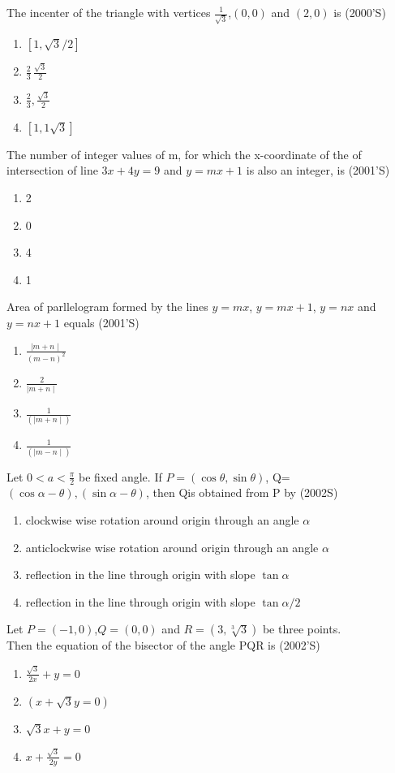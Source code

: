 \documentclass[12pt]{article}
\begin{document}
\item The incenter of the triangle with vertices $\frac{1}{\sqrt{3}}$,$(0,0)$ and $(2,0)$ is (2000'S)
\begin{enumerate}
\item $[1,\sqrt{3}/2]$ 
\item $\frac{2}{3}\,\frac{\sqrt{3}}{2}$ 
\item $\frac{2}{3},\frac{\sqrt{3}}{2}$ 
\item $[1,{1}{\sqrt{3}}]$
\end{enumerate}
\item The number of integer values of m, for which the x-coordinate of the of intersection of line $3x+4y=9$ and $y=mx+1$ is also an integer, is (2001'S)
\begin{enumerate}
\item 2 
\item 0 
\item 4   
\item 1
\end{enumerate}
\item Area of parllelogram formed by the lines $y=mx$, $y=mx+1$, $y=nx$ and $y=nx+1$ equals (2001'S)
\begin{enumerate}
\item $\frac{\mid m+n\mid}{(m-n)^2}$
\item $\frac{2}{\mid m+n \mid}$
\item $\frac{1}{(\mid m+n \mid)}$
\item $\frac{1}{(\mid m-n\mid)}$
\end{enumerate}
\item Let $0<a<\frac{\pi}{2}$ be fixed angle. If $P=(\cos\theta,\sin\theta)$, Q=$(\cos\alpha-\theta),(\sin\alpha-\theta)$, then Qis obtained from P by (2002S)
\begin{enumerate}
\item clockwise wise rotation around origin through an angle $\alpha$
\item anticlockwise wise rotation around origin through an angle $\alpha$
\item reflection in the line through origin with slope $\tan\alpha$
\item reflection in the line through origin with slope $\tan\alpha/2$
\end{enumerate}
\item Let $P=(-1,0)$,$Q=(0,0)$ and $R=(3,\sqrt[3]{3})$ be three points.\\
Then the equation of the bisector of the angle PQR is (2002'S)
\begin{enumerate}
\item $\frac{\sqrt{3}}{2x}+y=0$ 
\item $(x+\sqrt{3}y=0)$
\item $\sqrt{3}x+y=0$ 
\item $x+\frac{\sqrt{3}}{2y}=0$
\end{enumerate}
\end{document}

